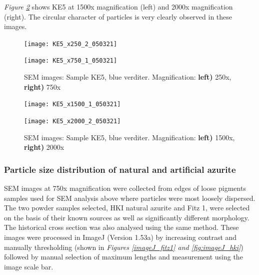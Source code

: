 \textit{Figure \ref{fig:KE5_sem_2}} shows KE5 at 1500x magnification (left) and 2000x magnification (right). The circular character of particles is very clearly observed in these images.

\begin{figure}[H]
\centering
\begin{minipage}{.45\textwidth}
  \centering
  \texttt{[image: KE5\_x250\_2\_050321]}
\end{minipage}
\begin{minipage}{.45\textwidth}
  \centering
  \texttt{[image: KE5\_x750\_1\_050321]}
\end{minipage}
\caption[SEM images: Sample KE5, blue verditer]{SEM images: Sample KE5, blue verditer. Magnification: \textbf{left)} 250x, \textbf{right)} 750x}
\label{fig:KE5_sem_1}
\end{figure}

\begin{figure}[H]
\centering
\begin{minipage}{.45\textwidth}
  \centering
  \texttt{[image: KE5\_x1500\_1\_050321]}
\end{minipage}
\begin{minipage}{.45\textwidth}
  \centering
  \texttt{[image: KE5\_x2000\_2\_050321]}
\end{minipage}
\caption[SEM images: Sample KE5, blue verditer]{SEM images: Sample KE5, blue verditer. Magnification: \textbf{left)} 1500x, \textbf{right)} 2000x}
\label{fig:KE5_sem_2}
\end{figure}

\subsubsection[Particle size distribution of natural and artificial azurite]{Particle size distribution of natural and artificial azurite}
\label{subsubsection3.1.1.1}

SEM images at 750x magnification were collected from edges of loose pigments samples used for SEM analysis above where particles were most loosely dispersed. The two powder samples selected, HKI natural azurite and Fitz 1, were selected on the basis of their known sources as well as significantly different morphology. The historical cross section was also analysed using the same method. These images were processed in ImageJ (Version 1.53a) by increasing contrast and manually thresholding (shown in \textit{Figures \ref{imageJ_fitz1} and \ref{fig:imageJ_hki}}) followed by manual selection of maximum lengths and measurement using the image scale bar. 


